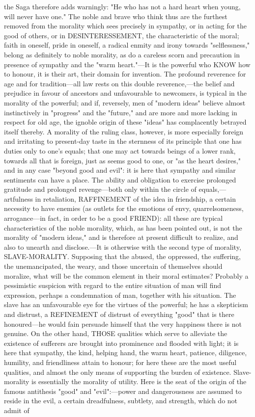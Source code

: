 \documentclass[12pt]{article}
\begin{document}
the Saga therefore adds warningly: "He who has not a hard heart when young, will never have one." The noble and brave who think thus are the furthest removed from the morality which sees precisely in sympathy, or in acting for the good of others, or in DESINTERESSEMENT, the characteristic of the moral; faith in oneself, pride in oneself, a radical enmity and irony towards "selflessness," belong as definitely to noble morality, as do a careless scorn and precaution in presence of sympathy and the "warm heart."---It is the powerful who KNOW how to honour, it is their art, their domain for invention. The profound reverence for age and for tradition---all law rests on this double reverence,---the belief and prejudice in favour of ancestors and unfavourable to newcomers, is typical in the morality of the powerful; and if, reversely, men of "modern ideas" believe almost instinctively in "progress" and the "future," and are more and more lacking in respect for old age, the ignoble origin of these "ideas" has complacently betrayed itself thereby. A morality of the ruling class, however, is more especially foreign and irritating to present-day taste in the sternness of its principle that one has duties only to one's equals; that one may act towards beings of a lower rank, towards all that is foreign, just as seems good to one, or "as the heart desires," and in any case "beyond good and evil": it is here that sympathy and similar sentiments can have a place. The ability and obligation to exercise prolonged gratitude and prolonged revenge---both only within the circle of equals,---artfulness in retaliation, RAFFINEMENT of the idea in friendship, a certain necessity to have enemies (as outlets for the emotions of envy, quarrelsomeness, arrogance---in fact, in order to be a good FRIEND): all these are typical characteristics of the noble morality, which, as has been pointed out, is not the morality of "modern ideas," and is therefore at present difficult to realize, and also to unearth and disclose.---It is otherwise with the second type of morality, SLAVE-MORALITY. Supposing that the abused, the oppressed, the suffering, the unemancipated, the weary, and those uncertain of themselves should moralize, what will be the common element in their moral estimates? Probably a pessimistic suspicion with regard to the entire situation of man will find expression, perhaps a condemnation of man, together with his situation. The slave has an unfavourable eye for the virtues of the powerful; he has a skepticism and distrust, a REFINEMENT of distrust of everything "good" that is there honoured---he would fain persuade himself that the very happiness there is not genuine. On the other hand, THOSE qualities which serve to alleviate the existence of sufferers are brought into prominence and flooded with light; it is here that sympathy, the kind, helping hand, the warm heart, patience, diligence, humility, and friendliness attain to honour; for here these are the most useful qualities, and almost the only means of supporting the burden of existence. Slave-morality is essentially the morality of utility. Here is the seat of the origin of the famous antithesis "good" and "evil":---power and dangerousness are assumed to reside in the evil, a certain dreadfulness, subtlety, and strength, which do not admit of 
\end{document}
